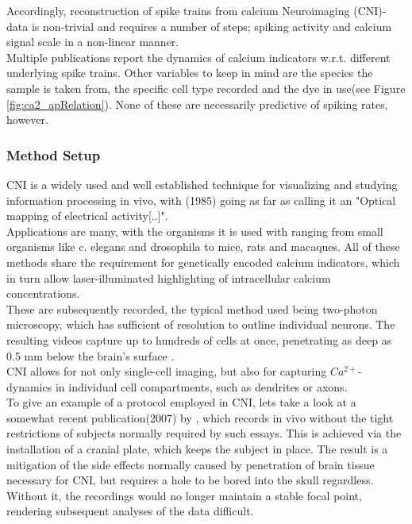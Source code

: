 \documentclass[titlepage]{article}
\begin{document}
Accordingly, reconstruction of spike trains from calcium Neuroimaging (CNI)-data is non-trivial and requires a number of steps; spiking activity and calcium signal scale in a non-linear manner.\\
Multiple publications report the dynamics of calcium indicators\cite{yaksi_reconstruction_2006}\cite{dana_sensitive_2016}\cite{akerboom_optimization_2012}\cite{chen_ultrasensitive_2013} w.r.t. different underlying spike trains. Other variables to keep in mind are the species the sample is taken from, the specific cell type recorded and the dye in use(see Figure \ref{fig:ca2_apRelation}). None of these are necessarily predictive of spiking rates, however.
\subsubsection{Method Setup}
CNI is a widely used and well established technique for visualizing and studying information processing in vivo\cite{grienberger_imaging_2012}, with \citeauthor{orbach_optical_1985}(1985) going as far as calling it an "Optical mapping of electrical activity[..]".\\
Applications are many, with the organisms it is used with ranging from small organisms like c. elegans and drosophila to mice, rats and macaques\cite{li_long-term_2017}\cite{tian_imaging_2009}. All of these methods share the requirement for genetically encoded calcium indicators, which in turn allow laser-illuminated highlighting of intracellular calcium concentrations\cite{denk_two-photon_1990}.\\
These are subsequently recorded, the typical method used being two-photon microscopy, which has sufficient of resolution to outline individual neurons.
The resulting videos capture up to hundreds of cells at once, penetrating as deep as 0.5 mm below the brain's surface \cite{denk_two-photon_1990}.\\
CNI allows for not only single-cell imaging, but also for capturing $Ca^{2+}$-dynamics in individual cell compartments, such as dendrites or axons\cite{miyazaki_simultaneous_2015}.\\
To give an example of a protocol employed in CNI, lets take a look at a somewhat recent publication(2007) by \citeauthor{dombeck_imaging_2007}, which records in vivo without the tight restrictions of subjects normally required by such essays.
This is achieved via the installation of a cranial plate, which keeps the subject in place.
The result is a mitigation of the side effects normally caused by penetration of brain tissue necessary for CNI, but requires a hole to be bored into the skull regardless. Without it, the recordings would no longer maintain a stable focal point, rendering subsequent analyses of the data difficult.\\ 
\end{document}
